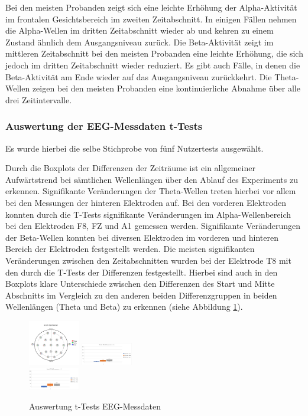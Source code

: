 \documentclass[conference]{IEEEtran}
\begin{document}
Bei den meisten Probanden zeigt sich eine leichte Erhöhung der Alpha-Aktivität im frontalen Gesichtsbereich im zweiten Zeitabschnitt. In einigen Fällen nehmen die Alpha-Wellen im dritten Zeitabschnitt wieder ab und kehren zu einem Zustand ähnlich dem Ausgangsniveau zurück. Die Beta-Aktivität zeigt im mittleren Zeitabschnitt bei den meisten Probanden eine leichte Erhöhung, die sich jedoch im dritten Zeitabschnitt wieder reduziert. Es gibt auch Fälle, in denen die Beta-Aktivität am Ende wieder auf das Ausgangsniveau zurückkehrt. Die Theta-Wellen zeigen bei den meisten Probanden eine kontinuierliche Abnahme über alle drei Zeitintervalle.

\subsubsection{Auswertung der EEG-Messdaten t-Tests}
Es wurde hierbei die selbe Stichprobe von fünf Nutzertests ausgewählt.

Durch die Boxplots der Differenzen der Zeiträume ist ein allgemeiner Aufwärtstrend bei sämtlichen Wellenlängen über den Ablauf des Experiments zu erkennen. Signifikante Veränderungen der Theta-Wellen treten hierbei vor allem bei den Messungen der hinteren Elektroden auf. Bei den vorderen Elektroden konnten durch die T-Tests signifikante Veränderungen im Alpha-Wellenbereich bei den Elektroden F8, FZ und A1 gemessen werden. Signifikante Veränderungen der Beta-Wellen konnten bei diversen Elektroden im vorderen und hinteren Bereich der Elektroden festgestellt werden. Die meisten signifikanten Veränderungen zwischen den Zeitabschnitten wurden bei der Elektrode T8 mit den durch die T-Tests der Differenzen festgestellt. Hierbei sind auch in den Boxplots klare Unterschiede zwischen den Differenzen des Start und Mitte Abschnitts im Vergleich zu den anderen beiden Differenzgruppen in beiden Wellenlängen (Theta und Beta) zu erkennen (siehe Abbildung \ref{fig:auswertung_t_test_eeg}).

\begin{figure}[ht]
	\centering
	\includegraphics[width=0.2\textwidth]{assets/Signifikanzen.png} \hspace{-5pt}
	\includegraphics[width=0.2\textwidth]{assets/ThetaT8.png} \\
	\vspace{2pt}
	\includegraphics[width=0.2\textwidth]{assets/BetaT8.png} \hspace{-5pt}
	\caption{Auswertung t-Tests EEG-Messdaten}
	\label{fig:auswertung_t_test_eeg}
\end{figure}
\end{document}
